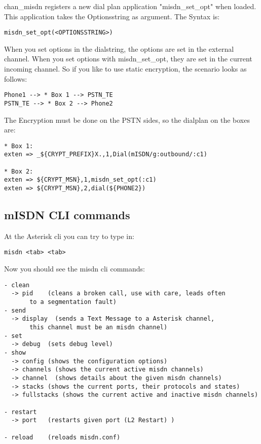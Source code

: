 chan\_misdn registers a new dial plan application "misdn\_set\_opt" when
loaded. This application takes the Optionsstring as argument. The Syntax is:

\begin{verbatim}
misdn_set_opt(<OPTIONSSTRING>)
\end{verbatim}

When you set options in the dialstring, the options are set in the external
channel. When you set options with misdn\_set\_opt, they are set in the current
incoming channel. So if you like to use static encryption, the scenario looks
as follows:

\begin{verbatim}
Phone1 --> * Box 1 --> PSTN_TE 
PSTN_TE --> * Box 2 --> Phone2
\end{verbatim}

The Encryption must be done on the PSTN sides, so the dialplan on the boxes
are:

\begin{verbatim}
* Box 1:
exten => _${CRYPT_PREFIX}X.,1,Dial(mISDN/g:outbound/:c1)

* Box 2:
exten => ${CRYPT_MSN},1,misdn_set_opt(:c1)
exten => ${CRYPT_MSN},2,dial(${PHONE2})
\end{verbatim}


\subsection{mISDN CLI commands}

At the Asterisk cli you can try to type in: 

\begin{verbatim}
misdn <tab> <tab>
\end{verbatim}

Now you should see the misdn cli commands: 

\begin{verbatim}
- clean
  -> pid    (cleans a broken call, use with care, leads often
       to a segmentation fault)
- send
  -> display  (sends a Text Message to a Asterisk channel, 
       this channel must be an misdn channel)
- set
  -> debug  (sets debug level)
- show
  -> config (shows the configuration options)
  -> channels (shows the current active misdn channels)
  -> channel  (shows details about the given misdn channels)
  -> stacks (shows the current ports, their protocols and states)
  -> fullstacks (shows the current active and inactive misdn channels)

- restart 
  -> port   (restarts given port (L2 Restart) )

- reload    (reloads misdn.conf)
\end{verbatim}

